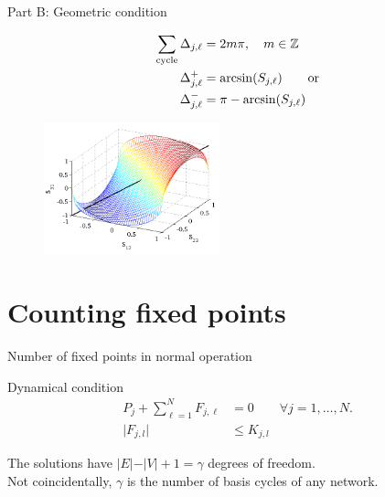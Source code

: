 \documentclass[xcolor=x11names,compress]{beamer}
\renewcommand{\(}{\begin{columns}}
\renewcommand{\)}{\end{columns}}
\newcommand{\<}[1]{\begin{column}{#1}}
\renewcommand{\>}{\end{column}}
\newcommand{\abs}[1]{\vert#1\vert}
\begin{document}
\begin{frame}{Part B: Geometric condition}
\begin{block}{}
\begin{align}
    \sum_{\rm cycle} \Delta_{j,\ell} & = 2 m \pi, \quad m\in\mathbb{Z}\\
    \Delta_{j,\ell}^+ &= \arcsin(S_{j,\ell}) \qquad \mbox{or} \\
    \Delta_{j,\ell}^- &= \pi -  \arcsin(S_{j,\ell})
     \label{eqn:deltaS} 
\end{align}
\end{block}

\begin{figure}
\begin{center}
\includegraphics[width=2in]{cycle3b}
\end{center}
\end{figure}
\end{frame}

\section{Counting fixed points}
\begin{frame}{Number of fixed points in normal operation}
\begin{block}{Dynamical condition}
\begin{align}
P_j + \sum_{\ell=1}^N F_{j,\ell} &= 0 \qquad 
              \forall j=1,\ldots,N. \\
\abs{F_{j,l}}&\leq K_{j,l}
\label{eq:constraint_F}
\end{align}

\end{block}


The solutions have $\abs{E}-\abs{V}+1=\gamma$ degrees of freedom.  \\
\pause{}
Not
coincidentally, $\gamma$ is the number of basis cycles of any network.  
\end{frame}
\end{document}
